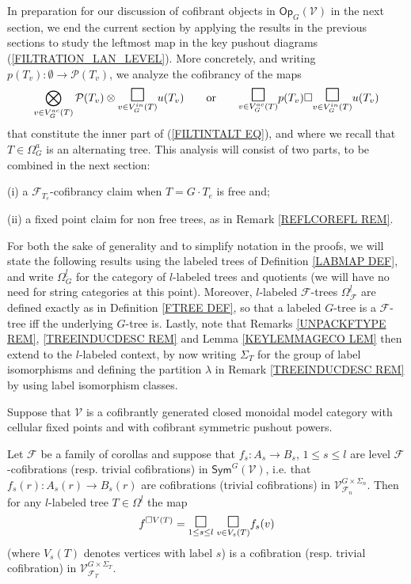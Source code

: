 \documentclass[a4paper,10pt]{article}%
\begin{document}
In preparation for our discussion of cofibrant objects in $\mathsf{Op}_G(\mathcal{V})$
in the next section, 
we end the current section by applying 
the results in the previous sections to study the leftmost map in the key pushout diagrams
(\ref{FILTRATION_LAN_LEVEL}).
More concretely, 
and writing 
$p(T_v) \colon \emptyset \to \mathcal{P}(T_v)$,
we analyze the cofibrancy of the maps
\[
	\bigotimes\limits_{v \in V_{G}^{ac}(T)}\P(T_v) \otimes
	\underset{v \in V_{G}^{in}(T)}
	{\mathlarger{\mathlarger{\mathlarger{\square}}}}
	u(T_v)
\qquad
\text{or}
\qquad
	\underset{v \in V_{G}^{ac}(T)}
	{\mathlarger{\mathlarger{\mathlarger{\square}}}}
	p(T_v) 
		\square
	\underset{v \in V_{G}^{in}(T)}
	{\mathlarger{\mathlarger{\mathlarger{\square}}}}
	u(T_v)
\]
that constitute the inner part of (\ref{FILTINTALT EQ}), and where we recall that $T \in \Omega_G^a$ is an alternating tree.
This analysis will consist of two parts, to be combined in the next section:
\begin{inparaenum}
\item[(i)] a $\mathcal{F}_{T_e}$-cofibrancy claim when $T=G \cdot T_e$ is free and;
\item[(ii)] a fixed point claim for non free trees, 
as in Remark \ref{REFLCOREFL REM}.
\end{inparaenum}


For both the sake of generality and to simplify notation in the proofs, we will state the following results using the labeled trees 
of Definition \ref{LABMAP DEF},
and write 
$\Omega_G^{\underline{l}}$ for the category of 
$l$-labeled trees and quotients 
(we will have no need for string categories at this point).
Moreover, $l$-labeled $\mathcal{F}$-trees 
$\Omega_{\mathcal{F}}^{\underline{l}}$ are
defined exactly as in Definition \ref{FTREE DEF},
so that a labeled $G$-tree is a $\mathcal{F}$-tree iff the underlying $G$-tree is.
Lastly, note that Remarks \ref{UNPACKFTYPE REM}, \ref{TREEINDUCDESC REM}
and Lemma \ref{KEYLEMMAGECO LEM} then extend to the $l$-labeled context, by now writing $\Sigma_T$ for the group of label isomorphisms and defining the partition $\lambda$ 
in Remark \ref{TREEINDUCDESC REM}
by using label isomorphism classes.


\begin{proposition}\label{AUTTCOFPUSH PROP}
	Suppose that $\mathcal{V}$ is a cofibrantly generated closed monoidal model category with cellular fixed points and with cofibrant symmetric pushout powers.

	Let $\mathcal{F}$ be a family of corollas 
	and suppose that 
	$f_s \colon A_s \to B_s$, $1 \leq s \leq l$ are level $\mathcal{F}$-cofibrations (resp. trivial cofibrations)
	in $\mathsf{Sym}^G(\mathcal{V})$, i.e. that 
	$f_s(r) \colon A_s(r) \to B_s(r)$ are cofibrations (trivial cofibrations) in 
	$\mathcal{V}^{G \times \Sigma_n}_{\mathcal{F}_n}$.
	Then for any $l$-labeled tree $T \in \Omega^{\underline{l}}$ the map
	\[
	f^{\square V(T)} = 
		\underset{1\leq s \leq l}{\mathlarger{\mathlarger{\square}}}
		\phantom{!}
		\underset{v \in V_s(T)}{\mathlarger{\mathlarger{\square}}}
	f_s(v)\]
	(where $V_s(T)$ denotes vertices with label $s$) is a cofibration (resp. trivial cofibration) in 
	$\mathcal{V}^{G \times \Sigma_T}_{\mathcal{F}_T}$.
\end{proposition}
\end{document}
